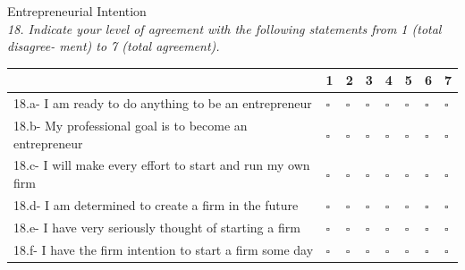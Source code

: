 \large{Entrepreneurial Intention}
\\
\emph{18. Indicate your level of agreement with the following statements from 1 (total disagree- ment) to 7 (total agreement).}

\begin{table}[H]
\scriptsize	
\centering

\begin{tabular}{p{10cm}lllllll}
\toprule
                                                                                                                                     & 1         & 2         & 3         & 4         & 5         & 6         & 7         \\ \midrule
18.a- I am ready to do anything to be an entrepreneur       & $\square$ & $\square$ & $\square$ & $\square$ & $\square$ & $\square$ & $\square$ \\
18.b- My professional goal is to become an entrepreneur     & $\square$ & $\square$ & $\square$ & $\square$ & $\square$ & $\square$ & $\square$ \\
18.c- I will make every effort to start and run my own firm & $\square$ & $\square$ & $\square$ & $\square$ & $\square$ & $\square$ & $\square$ \\
18.d- I am determined to create a firm in the future        & $\square$ & $\square$ & $\square$ & $\square$ & $\square$ & $\square$ & $\square$ \\
18.e- I have very seriously thought of starting a firm      & $\square$ & $\square$ & $\square$ & $\square$ & $\square$ & $\square$ & $\square$ \\ 
18.f- I have the firm intention to start a firm some day    & $\square$ & $\square$ & $\square$ & $\square$ & $\square$ & $\square$ & $\square$ \\ \bottomrule

\end{tabular}
\end{table}

